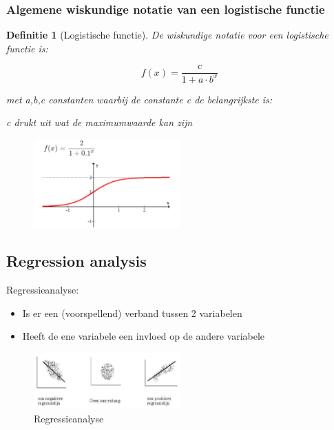 \documentclass{article}
\newtheorem{theorem}{Definitie}[section]
\begin{document}
\subsubsection{Algemene wiskundige notatie van een logistische functie}

\begin{theorem}[Logistische functie]
De wiskundige notatie voor een logistische functie is:

\begin{equation}
    f(x) = \frac{c}{1 + a\cdot b^x}
\end{equation}

met a,b,c constanten waarbij de constante c de belangrijkste is:

c drukt uit wat de maximumwaarde kan zijn
\end{theorem}

\begin{figure}[H]
    \centering
    \includegraphics[width=0.5\textwidth]{logistische-functie-wiskundig.png}
    \caption{}
\end{figure}

\subsection{Regression analysis}

Regressieanalyse:

\begin{itemize}
    \item Is er een (voorspellend) verband tussen 2 variabelen
    \item Heeft de ene variabele een invloed op de andere variabele
\end{itemize}

\begin{figure}[H]
    \centering
    \includegraphics[width=0.5\textwidth]{regressie.png}
    \caption{Regressieanalyse}
\end{figure}
\end{document}

